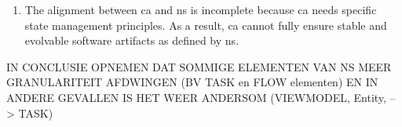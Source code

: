 \begin{enumerate}[resume, leftmargin=*]
    \item The alignment between \gls{ca} and \gls{ns} is incomplete because \gls{ca} needs
    specific state management principles. As a result, \gls{ca} cannot fully ensure stable and
    evolvable software artifacts as defined by \gls{ns}.
\end{enumerate}


IN CONCLUSIE OPNEMEN DAT SOMMIGE ELEMENTEN VAN NS MEER GRANULARITEIT AFDWINGEN (BV TASK en
FLOW elementen) EN IN ANDERE GEVALLEN IS HET WEER ANDERSOM (VIEWMODEL, Entity, --> TASK)








